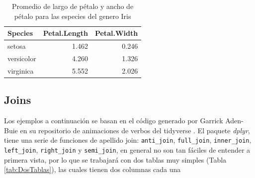 \documentclass[]{book}
\newenvironment{Shaded}{\begin{snugshade}}{\end{snugshade}}
\newcommand{\KeywordTok}[1]{\textcolor[rgb]{0.13,0.29,0.53}{\textbf{#1}}}
\newcommand{\NormalTok}[1]{#1}
\newcommand{\OperatorTok}[1]{\textcolor[rgb]{0.81,0.36,0.00}{\textbf{#1}}}
\newcommand{\StringTok}[1]{\textcolor[rgb]{0.31,0.60,0.02}{#1}}
\begin{document}
\begin{Shaded}
\end{Shaded}

\begin{Shaded}
\end{Shaded}

\begin{table}

\caption{\label{tab:Selected}Promedio de largo de pétalo y ancho de pétalo para las especies del genero Iris}
\centering
\begin{tabular}[t]{lrr}
\toprule
Species & Petal.Length & Petal.Width\\
\midrule
setosa & 1.462 & 0.246\\
versicolor & 4.260 & 1.326\\
virginica & 5.552 & 2.026\\
\bottomrule
\end{tabular}
\end{table}

\hypertarget{joins}{%
\subsection{Joins}\label{joins}}

Los ejemplos a continuación se basan en el código generado por Garrick
Aden-Buie en su repositorio de animaciones de verbos del tidyverse
\citep{AdenBuie2018}. El paquete \emph{dplyr}, tiene una serie de
funciones de apellido join: \texttt{anti\_join}, \texttt{full\_join},
\texttt{inner\_join}, \texttt{left\_join}, \texttt{right\_join} y
\texttt{semi\_join}, en general no son tan fáciles de entender a primera
vista, por lo que se trabajará con dos tablas muy simples (Tabla
\ref{tab:DosTablas}), las cuales tienen dos columnas cada una
\end{document}
